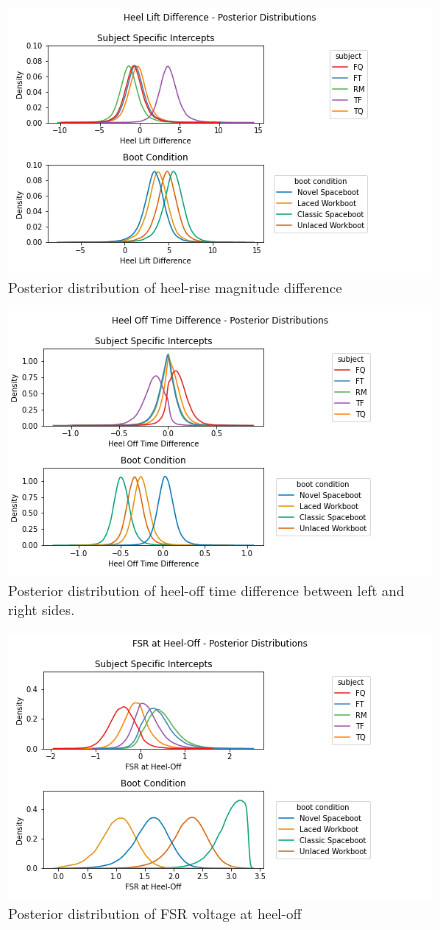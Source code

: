 \documentclass[defaultstyle,11pt]{thesis}
\begin{document}
\begin{figure}
\centering
\includegraphics{../fig/Appendix/Heel Lift Difference_posterior.png}
\caption{Posterior distribution of heel-rise magnitude difference}
\end{figure}

\begin{figure}
\centering
\includegraphics{../fig/Appendix/Heel Off Time Difference_posterior.png}
\caption{Posterior distribution of heel-off time difference between left and right sides.}
\end{figure}

\begin{figure}
\centering
\includegraphics{../fig/Appendix/FSR at Heel-Off_posterior.png}
\caption{Posterior distribution of FSR voltage at heel-off}
\end{figure}
\end{document}
